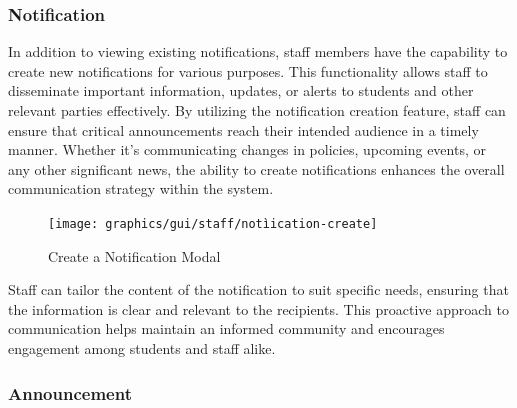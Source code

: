 	\subsubsection{Notification}
	In addition to viewing existing notifications, staff members have the capability to create new notifications for various purposes. This functionality allows staff to disseminate important information, updates, or alerts to students and other relevant parties effectively. By utilizing the notification creation feature, staff can ensure that critical announcements reach their intended audience in a timely manner. Whether it's communicating changes in policies, upcoming events, or any other significant news, the ability to create notifications enhances the overall communication strategy within the system. 
%	
	
	\begin{figure}[H]
		\centering
		\texttt{[image: graphics/gui/staff/notìication-create]}
		\caption{Create a Notification Modal}
		\label{fig:gui-st-notiication-create}
	\end{figure}
	
	\noindent Staff can tailor the content of the notification to suit specific needs, ensuring that the information is clear and relevant to the recipients. This proactive approach to communication helps maintain an informed community and encourages engagement among students and staff alike.
	

	
	
	\subsubsection{Announcement}
	
